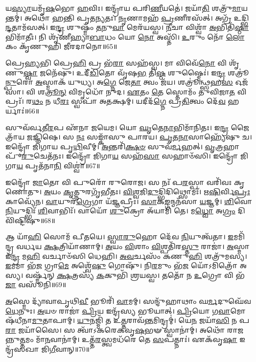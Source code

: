 𑌯\-\ul{𑌸𑍍𑌯𑌾}\-𑌯𑌮𑍃᳴\-\ul{𑌷}\-𑌭𑍋 \ul{𑌹}\-𑌵𑌿𑌃।
𑌇𑌨𑍍𑌦𑍍𑌰𑌾᳴𑌯 𑌪𑌰𑌿\-\ul{𑌣𑍀}\-𑌯𑌤𑍇॑।
𑌜𑌯𑌾᳴\-\ul{𑌤𑌿} 𑌶𑌤𑍍𑌰𑍁᳴\-\ul{𑌮𑌾}\-𑌯𑌨𑍍𑌤𑌮𑍍॑।
𑌅𑌥𑍋᳴ 𑌹𑌨𑍍𑌤𑌿 𑌪𑍃𑌤\-\ul{𑌨𑍍𑌯}\-𑌤𑌃।
\-\ul{𑌨𑍃}\-𑌣𑌾𑌮𑌹᳴ \ul{𑌪𑍍𑌰}\-𑌣𑍀𑌰𑌸᳴𑌤𑍍।
𑌅𑌗𑍍𑌰᳴ 𑌉𑌦𑍍𑌭𑌿\-\ul{𑌨𑍍𑌦}\-𑌤𑌾𑌮᳴𑌸𑌤𑍍।
𑌇\-\ul{𑌨𑍍𑌦𑍍𑌰} 𑌶𑍁𑌷𑍍𑌮𑌂᳴ \ul{𑌤}\-𑌨𑍁\-\ul{𑌵𑌾} 𑌮𑍇𑌰᳴𑌯𑌸𑍍𑌵।
\-\ul{𑌨𑍀}\-𑌚𑌾 𑌵𑌿𑌶𑍍𑌵𑌾᳴ \ul{𑌅}\-𑌭𑌿𑌤𑌿᳴\-\ul{𑌷𑍍𑌠𑌾}\-𑌭𑌿𑌮𑌾᳴𑌤𑍀𑌃।
𑌨𑌿 𑌶𑍃᳴𑌣𑍀𑌹𑍍𑌯𑌾\-\ul{𑌬𑌾}\-𑌧𑌂 𑌯𑍋 \ul{𑌨𑍋} 𑌅𑌸𑍍𑌤𑌿᳴।
\-\ul{𑌉}\-𑌰𑍁𑌂 𑌨𑍋᳴ \ul{𑌲𑍋}\-𑌕𑌂 𑌕𑍃᳴𑌣𑍁𑌹𑌿 𑌜𑍀𑌰𑌦𑌾𑌨𑍋॥65॥

𑌪𑍍𑌰𑍇\-\ul{𑌹𑍍𑌯}\-𑌭𑌿 𑌪𑍍𑌰𑍇\-\ul{𑌹𑌿} 𑌪𑍍𑌰 𑌭᳴\-\ul{𑌰𑌾} 𑌸𑌹᳴𑌸𑍍𑌵।
𑌮𑌾 𑌵𑌿𑌵𑍇᳴\-\ul{𑌨𑍋} 𑌵𑌿 𑌶𑍃᳴𑌣𑍁\-\ul{𑌷𑍍𑌵𑌾} 𑌜𑌨𑍇᳴𑌷𑍁।
𑌉𑌦𑍀᳴\-\ul{𑌡𑌿}\-𑌤𑍋 𑌵𑍃᳴𑌷\-\ul{𑌭} 𑌤𑌿\-\ul{𑌷𑍍𑌠} 𑌶𑍁𑌷𑍍𑌮𑍈𑌃॑।
𑌇\-\ul{𑌨𑍍𑌦𑍍𑌰} 𑌶𑌤𑍍𑌰𑍂॑\-\ul{𑌨𑍍𑌪𑍁}\-𑌰𑍋 \ul{𑌅}\-𑌸𑍍𑌮𑌾𑌕᳴ 𑌯𑍁𑌧𑍍𑌯।
𑌅\-\ul{𑌗𑍍𑌨𑍇} 𑌜𑍇\-\ul{𑌤𑌾} 𑌤𑍍𑌵𑌂 𑌜᳴𑌯।
𑌶𑌤𑍍𑌰𑍂॑𑌨𑍍𑌥𑍍𑌸𑌹\-\ul{𑌸} 𑌓𑌜᳴𑌸𑌾।
𑌵𑌿 𑌶\-\ul{𑌤𑍍𑌰𑍂}\-\-\ul{𑌨𑍍} 𑌵𑌿𑌮𑍃𑌧𑍋᳴ 𑌨𑍁𑌦।
\-\ul{𑌏}\-𑌤𑌂 \ul{𑌤𑍇} 𑌸𑍍𑌤𑍋𑌮𑌂᳴ 𑌤𑍁𑌵𑌿𑌜𑌾\-\ul{𑌤} 𑌵𑌿𑌪𑍍𑌰𑌃᳴।
𑌰\-\ul{𑌥𑌂} 𑌨 𑌧𑍀\-\ul{𑌰𑌃} 𑌸𑍍𑌵𑌪𑌾᳴ 𑌅𑌤𑌕𑍍𑌷𑌮𑍍।
𑌯𑌦𑍀𑌦᳴\-\ul{𑌗𑍍𑌨𑍇} 𑌪𑍍𑌰\-\ul{𑌤𑌿}\-𑌤𑍍𑌵𑌂 𑌦𑍇᳴\-\ul{𑌵} 𑌹𑌰𑍍𑌯𑌾𑌃॑॥66॥

𑌸𑍁𑌵᳴𑌰𑍍𑌵𑌤𑍀\-\ul{𑌰}\-𑌪 𑌏᳴𑌨𑌾 𑌜𑌯𑍇𑌮।
𑌯𑍋 \ul{𑌘𑍃}\-𑌤𑍇\-\ul{𑌨𑌾}\-𑌭𑌿𑌮𑌾᳴𑌨𑌿𑌤𑌃।
𑌇\-\ul{𑌨𑍍𑌦𑍍𑌰} 𑌜𑍈𑌤𑍍𑌰𑌾᳴𑌯 𑌜𑌜𑍍𑌞𑌿𑌷𑍇।
𑌸 \ul{𑌨𑌃} 𑌸𑌙𑍍𑌕𑌾᳴𑌸𑍁 𑌪𑌾𑌰𑌯।
\-\ul{𑌪𑍃}\-\-\ul{𑌤}\-\-\ul{𑌨𑌾}\-𑌸𑌾𑌹𑍍𑌯𑍇᳴𑌷𑍁 𑌚।
𑌇𑌨𑍍𑌦𑍍𑌰𑍋᳴ 𑌜𑌿𑌗𑌾𑌯 𑌪𑍃\-\ul{𑌥𑌿}\-𑌵𑍀𑌮𑍍।
\-\ul{𑌅}\-𑌨𑍍𑌤𑌰𑌿᳴\-\ul{𑌕𑍍𑌷}\-\-\ul{𑍞} 𑌸𑍁𑌵᳴\-\ul{𑌰𑍍𑌮}\-𑌹𑌤𑍍।
\-\ul{𑌵𑍃}\-\-\ul{𑌤𑍍𑌰}\-𑌹𑌾 𑌪𑍁᳴\-\ul{𑌰𑍁}\-𑌚𑍇𑌤᳴𑌨𑌃।
𑌇𑌨𑍍𑌦𑍍𑌰𑍋᳴ 𑌜𑌿𑌗𑌾\-\ul{𑌯} 𑌸𑌹᳴\-\ul{𑌸𑌾} 𑌸𑌹𑌾𑍞᳴𑌸𑌿।
𑌇𑌨𑍍𑌦𑍍𑌰𑍋᳴ 𑌜𑌿𑌗𑌾\-\ul{𑌯} 𑌪𑍃𑌤᳴𑌨𑌾\-\ul{𑌨𑌿} 𑌵𑌿𑌶𑍍𑌵𑌾॑॥67॥

𑌇𑌨𑍍𑌦𑍍𑌰𑍋᳴ \ul{𑌜𑌾}\-𑌤𑍋 𑌵𑌿 𑌪𑍁𑌰𑍋᳴ 𑌰𑍁𑌰𑍋𑌜।
𑌸 𑌨𑌃᳴ 𑌪\-\ul{𑌰}\-𑌸𑍍𑌪𑌾 𑌵𑌰𑌿᳴𑌵𑌃 𑌕𑍃𑌣𑍋𑌤𑍁।
\-\ul{𑌅}\-𑌯𑌂 \ul{𑌕𑍃}\-𑌤𑍍𑌨𑍁𑌰𑌗𑍃᳴𑌭𑍀𑌤𑌃।
\-\ul{𑌵𑌿}\-\-\ul{𑌶𑍍𑌵}\-𑌜𑌿\-\ul{𑌦𑍁}\-𑌦𑍍𑌭𑌿𑌦𑌿𑌥𑍍𑌸𑍋𑌮𑌃᳴।
𑌋\-\ul{𑌷𑌿}\-𑌰𑍍𑌵𑌿\-\ul{𑌪𑍍𑌰𑌃} 𑌕𑌾𑌵𑍍𑌯𑍇᳴𑌨।
\-\ul{𑌵𑌾}\-𑌯𑍁𑌰᳴\-\ul{𑌗𑍍𑌰𑍇}\-𑌗𑌾 𑌯᳴\-\ul{𑌜𑍍𑌞}\-𑌪𑍍𑌰𑍀𑌃।
\-\ul{𑌸𑌾}\-𑌕\-\ul{𑌙𑍍𑌗}\-𑌨𑍍𑌮𑌨᳴𑌸𑌾 \ul{𑌯}\-𑌜𑍍𑌞𑌮𑍍।
\-\ul{𑌶𑌿}\-𑌵𑍋 \ul{𑌨𑌿}\-𑌯𑍁𑌦𑍍𑌭𑌿𑌃᳴ \ul{𑌶𑌿}\-𑌵𑌾𑌭𑌿𑌃᳴।
𑌵𑌾𑌯𑍋᳴ \ul{𑌶𑍁}\-𑌕𑍍𑌰𑍋 𑌅᳴𑌯𑌾𑌮𑌿 𑌤𑍇।
𑌮\-\ul{𑌧𑍍𑌵𑍋} 𑌅\-\ul{𑌗𑍍𑌰𑌂} 𑌦𑌿𑌵𑌿᳴𑌷𑍍𑌟𑌿𑌷𑍁॥68॥

𑌆 𑌯𑌾᳴\-\ul{𑌹𑌿} 𑌸𑍋𑌮᳴ 𑌪𑍀𑌤𑌯𑍇।
\-\ul{𑌸𑍍𑌵𑌾}\-\-\ul{𑌰𑍁}\-𑌹𑍋 𑌦𑍇᳴𑌵 \ul{𑌨𑌿}\-𑌯𑍁𑌤𑍍𑌵᳴𑌤𑌾।
\-\ul{𑌇}\-𑌮𑌮𑌿᳴𑌨𑍍𑌦𑍍𑌰 𑌵𑌰𑍍𑌧𑌯 \ul{𑌕𑍍𑌷}\-𑌤𑍍𑌰𑌿𑌯𑌾᳴𑌣𑌾𑌮𑍍।
\-\ul{𑌅}\-𑌯𑌂 \ul{𑌵𑌿}\-𑌶𑌾𑌂 \ul{𑌵𑌿}\-𑌶𑍍𑌪𑌤𑌿᳴𑌰\-\ul{𑌸𑍍𑌤𑍁} 𑌰𑌾𑌜𑌾॑।
\-\ul{𑌅}\-𑌸𑍍𑌮𑌾 𑌇᳴\-\ul{𑌨𑍍𑌦𑍍𑌰} 𑌮\-\ul{𑌹𑌿} 𑌵𑌰𑍍𑌚𑌾𑍞᳴𑌸𑌿 𑌧𑍇𑌹𑌿।
\-\ul{𑌅}\-\-\ul{𑌵}\-𑌰𑍍𑌚𑌸𑌂᳴ 𑌕𑌣𑍁\-\ul{𑌹𑌿} 𑌶𑌤𑍍𑌰𑍁᳴𑌮𑌸𑍍𑌯।
\-\ul{𑌇}\-𑌮𑌮𑌾 𑌭᳴\-\ul{𑌜} 𑌗𑍍𑌰𑌾\-\ul{𑌮𑍇} 𑌅𑌶𑍍𑌵𑍇᳴\-\ul{𑌷𑍁} 𑌗𑍋𑌷𑍁᳴।
𑌨𑌿\-\ul{𑌰}\-𑌮𑍁𑌂 𑌭᳴\-\ul{𑌜} 𑌯𑍋᳴\-𑌽𑌮𑌿𑌤𑍍𑌰𑍋᳴ 𑌅𑌸𑍍𑌯।
𑌵𑌰𑍍𑌷𑍍𑌮᳴𑌨𑍍 \ul{𑌕𑍍𑌷}\-𑌤𑍍𑌰𑌸𑍍𑌯᳴ \ul{𑌕}\-𑌕𑍁𑌭𑌿᳴ 𑌶𑍍𑌰𑌯𑌸𑍍𑌵।
𑌤𑌤𑍋᳴ 𑌨 \ul{𑌉}\-𑌗𑍍𑌰𑍋 𑌵𑌿 𑌭᳴\-\ul{𑌜𑌾} 𑌵𑌸𑍂᳴𑌨𑌿॥69॥

\-\ul{𑌅}\-𑌸𑍍𑌮𑍇 𑌦𑍍𑌯𑌾᳴𑌵𑌾𑌪𑍃𑌥𑌿\-\ul{𑌵𑍀} 𑌭𑍂𑌰𑌿᳴ \ul{𑌵𑌾}\-𑌮𑌮𑍍।
𑌸𑌨𑍍𑌦𑍁᳴𑌹𑌾𑌥𑌾𑌂 𑌘\-\ul{𑌰𑍍𑌮}\-𑌦𑍁𑌘𑍇᳴𑌵 \ul{𑌧𑍇}\-𑌨𑍁𑌃।
\-\ul{𑌅}\-𑌯𑍞 𑌰𑌾𑌜𑌾॑ \ul{𑌪𑍍𑌰𑌿}\-𑌯 𑌇𑌨𑍍𑌦𑍍𑌰᳴𑌸𑍍𑌯 𑌭𑍂𑌯𑌾𑌤𑍍।
\-\ul{𑌪𑍍𑌰𑌿}\-𑌯𑍋 𑌗\-\ul{𑌵𑌾}\-𑌮𑍋𑌷᳴𑌧𑍀𑌨𑌾\-\ul{𑌮𑍁}\-𑌤𑌾𑌪𑌾𑌮𑍍।
\-\ul{𑌯𑍁}\-𑌨𑌜𑍍𑌮𑌿᳴ 𑌤 𑌉\-\ul{𑌤𑍍𑌤}\-𑌰𑌾𑌵᳴\-\ul{𑌨𑍍𑌤}\-𑌮𑌿𑌨𑍍𑌦𑍍𑌰𑌮𑍍॑।
𑌯𑍇\-\ul{𑌨} 𑌜𑌯𑌾᳴\-\ul{𑌸𑌿} 𑌨 𑌪\-\ul{𑌰𑌾} 𑌜𑌯𑌾᳴𑌸𑍈।
𑌸 𑌤𑍍𑌵𑌾᳴\-𑌽𑌕𑌰𑍇𑌕𑌵𑍃\-\ul{𑌷}\-𑌭𑍟 𑌸𑍍𑌵𑌾𑌨𑌾॑𑌮𑍍।
𑌅𑌥𑍋᳴ 𑌰𑌾𑌜𑌨𑍍𑌨𑍁\-\ul{𑌤𑍍𑌤}\-𑌮𑌂 𑌮𑌾᳴\-\ul{𑌨}\-𑌵𑌾𑌨𑌾॑𑌮𑍍।
𑌉𑌤𑍍𑌤᳴\-\ul{𑌰}\-𑌸𑍍𑌤𑍍𑌵𑌮𑌧᳴𑌰𑍇 𑌤𑍇 \ul{𑌸}\-𑌪𑌤𑍍𑌨𑌾𑌃॑।
𑌏𑌕᳴𑌵𑍃\-\ul{𑌷𑌾} 𑌇𑌨𑍍𑌦𑍍𑌰᳴𑌸𑌖𑌾 𑌜𑌿\-\ul{𑌗𑍀}\-𑌵𑌾𑌨𑍍॥70॥


